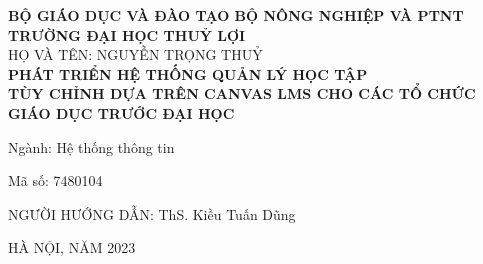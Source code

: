 \documentclass[main-report.tex]{subfiles}
\begin{document}
\begin{titlepage}
\thispagestyle{empty}

\begin{center}
{\bf\large BỘ GIÁO DỤC VÀ ĐÀO TẠO \hspace{1.5cm} BỘ NÔNG NGHIỆP VÀ PTNT}\\
{\bf\subtitlesize TRƯỜNG ĐẠI HỌC THUỶ LỢI}\\[3cm]


{\large HỌ VÀ TÊN: NGUYỄN TRỌNG THUỶ}\\
\vspace{3\baselineskip}
{\bf\LARGE PHÁT TRIỂN HỆ THỐNG QUẢN LÝ HỌC TẬP}\\
{\bf\LARGE TÙY CHỈNH DỰA TRÊN CANVAS LMS CHO CÁC TỔ CHỨC GIÁO DỤC TRƯỚC ĐẠI HỌC}\\[5cm]
\end{center}

\begin{center}
    {Ngành: Hệ thống thông tin}
\end{center}
\begin{center}
    {Mã số: 7480104}
\end{center}
\vspace{4cm}
\begin{center}
    {NGƯỜI HƯỚNG DẪN: ThS. Kiều Tuấn Dũng}
\end{center}
\vspace{4cm}
\begin{center}
{HÀ NỘI, NĂM 2023}
\end{center}
\end{titlepage}
\end{document}
